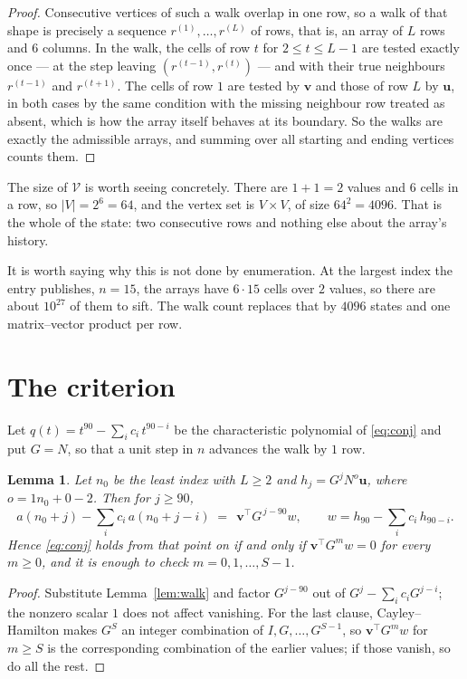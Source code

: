 \documentclass[11pt,a4paper]{article}
\theoremstyle{plain}
\newtheorem{lemma}[theorem]{Lemma}
\theoremstyle{definition}
\begin{document}
\begin{proof}
Consecutive vertices of such a walk overlap in one row, so a walk of that shape is
precisely a sequence $r^{(1)},\dots,r^{(L)}$ of rows, that is, an array of $L$ rows
and $6$ columns. In the walk, the cells of row $t$ for $2\le t\le L-1$ are tested
exactly once --- at the step leaving $(r^{(t-1)},r^{(t)})$ --- and with their true
neighbours $r^{(t-1)}$ and $r^{(t+1)}$. The cells of row $1$ are tested by
$\mathbf{v}$ and those of row $L$ by $\mathbf{u}$, in both cases by the same condition
with the missing neighbour row treated as absent, which is how the array itself behaves at
its boundary. So the walks are exactly the admissible arrays, and summing over all starting
and ending vertices counts them.
\end{proof}


The size of $\mathcal V$ is worth seeing concretely. There are $1+1=2$ values
and $6$ cells in a row, so $|V|=2^{6}=64$, and the vertex set is
$V\times V$, of size $64^2=4096$. That is the whole of the state: two consecutive
rows and nothing else about the array's history.

It is worth saying why this is not done by enumeration. At the largest index the entry
publishes, $n=15$, the arrays have $6\cdot15$ cells over
$2$ values, so there are about $10^{27}$ of them to sift. The
walk count replaces that by $4096$ states and one matrix--vector product per row.
\section{The criterion}

Let $q(t)=t^{90}-\sum_i c_i\,t^{90-i}$ be the characteristic polynomial of
\eqref{eq:conj} and put $G=N$, so that a unit step in $n$ advances the walk by
$1$ row.

\begin{lemma}\label{lem:crit}
Let $n_0$ be the least index with $L\ge2$ and $h_j=G^{j}N^{o}\mathbf{u}$, where
$o=1n_0+0-2$. Then for $j\ge90$,
\[
a(n_0+j)-\sum_i c_i\,a(n_0+j-i)\;=\;\,\mathbf{v}^{\!\top}G^{\,j-90}w,
\qquad w=h_{90}-\sum_i c_i\,h_{90-i} .
\]
Hence \eqref{eq:conj} holds from that point on if and only if
$\mathbf{v}^{\!\top}G^{m}w=0$ for every $m\ge0$, and it is enough to check
$m=0,1,\dots,S-1$.
\end{lemma}

\begin{proof}
Substitute Lemma~\ref{lem:walk} and factor $G^{j-90}$ out of
$G^{j}-\sum_ic_iG^{j-i}$; the nonzero scalar $1$ does not affect
vanishing. For the last clause, Cayley--Hamilton makes $G^{S}$ an integer combination of
$I,G,\dots,G^{S-1}$, so $\mathbf{v}^{\!\top}G^{m}w$ for $m\ge S$ is the corresponding
combination of the earlier values; if those vanish, so do all the rest.
\end{proof}
\end{document}
